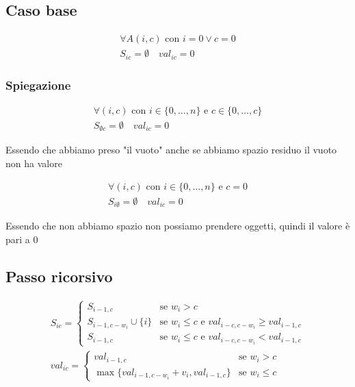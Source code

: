 \subsection{Caso base}

{
    \large

    \begin{gather*}
        \forall A(i,c) \text{ con } i=0 \lor c=0 \\
        S_{ic} = \emptyset \quad val_{ic} = 0
    \end{gather*}
}

\subsubsection{Spiegazione}
{
    \large
    \begin{gather*}
        \forall (i,c) \text{ con } i \in \{0, \dots, n\} \text{ e } c \in \{0 , \dots, c\} \\ 
        S_{\emptyset c} = \emptyset \quad val_{ic} = 0
    \end{gather*}
}
    \begin{center}
        Essendo che abbiamo preso "il vuoto" anche se abbiamo spazio residuo il vuoto non ha valore
    \end{center}

{
    \large

    \begin{gather*}
        \forall(i,c) \text{ con } i \in \{0, \dots, n\} \text{ e } c=0 \\
        S_{i\emptyset} = \emptyset \quad val_{ic} = 0
    \end{gather*}
}

\begin{center}
    Essendo che non abbiamo spazio non possiamo prendere oggetti, quindi il valore è pari a 0
\end{center}

\newpage
\subsection{Passo ricorsivo}
{
    \large

    \begin{gather*}
        S_{ic} = 
        \begin{cases}
            S_{i-1, c} & \text{se } w_i > c \\
            S_{i-1, c - w_i} \cup \{i\} & \text{se } w_i \leq c \text{ e } val_{i-c, c- w_i} \geq val_{i-1, c} \\
            S_{i-1, c} & \text{se } w_i \leq c \text{ e } val_{i-c, c- w_i} < val_{i-1, c}
        \end{cases} \\
        val_{ic} = 
        \begin{cases}
            val_{i-1,c} & \text{se } w_i > c \\
            \max\{val_{i-1,c-w_i} + v_i, val_{i-1,c}\} & \text{se } w_i \leq c
        \end{cases}
    \end{gather*}
}

